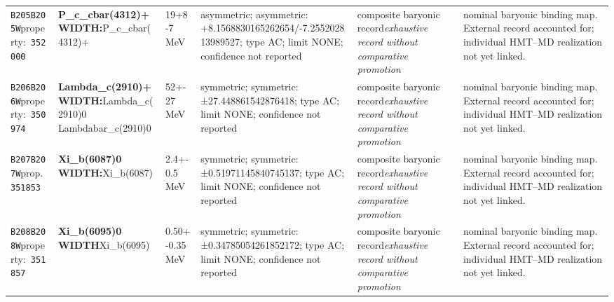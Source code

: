 \begin{landscape}
\begin{longtable}{L{1.85cm}L{4.45cm}L{2.35cm}L{4.05cm}L{3.35cm}L{7.15cm}}
\texttt{B205}\newline \texttt{B205W}\newline property:\ \texttt{352000} & \textbf{P\_\allowbreak{}c\_\allowbreak{}cbar(4312)+ WIDTH:}\newline P\_\allowbreak{}c\_\allowbreak{}cbar(4312)+ & 19+8-7\,MeV & asymmetric; asymmetric: +8.1568830165262654/-7.255202813989527; type AC; limit NONE; confidence not reported & composite baryonic record\newline \emph{exhaustive record without comparative promotion} & nominal baryonic binding map. External record accounted for; individual HMT--MD realization not yet linked. \\
\texttt{B206}\newline \texttt{B206W}\newline property:\ \texttt{350974} & \textbf{Lambda\_\allowbreak{}c(2910)+ WIDTH:}\newline Lambda\_\allowbreak{}c(2910)0 \textbar{}\allowbreak{} Lambdabar\_\allowbreak{}c(2910)0 & 52+-27\,MeV & symmetric; symmetric: ±27.448861542876418; type AC; limit NONE; confidence not reported & composite baryonic record\newline \emph{exhaustive record without comparative promotion} & nominal baryonic binding map. External record accounted for; individual HMT--MD realization not yet linked. \\
\texttt{B207}\newline \texttt{B207W}\newline prop.\ \texttt{351853} & \textbf{Xi\_\allowbreak{}b(6087)0 WIDTH:}\newline Xi\_\allowbreak{}b(6087) & 2.4+-0.5\,MeV & symmetric; symmetric: ±0.51971145840745137; type AC; limit NONE; confidence not reported & composite baryonic record\newline \emph{exhaustive record without comparative promotion} & nominal baryonic binding map. External record accounted for; individual HMT--MD realization not yet linked. \\
\texttt{B208}\newline \texttt{B208W}\newline property:\ \texttt{351857} & \textbf{Xi\_\allowbreak{}b(6095)0 WIDTH}\newline Xi\_\allowbreak{}b(6095) & 0.50+-0.35\,MeV & symmetric; symmetric: ±0.34785054261852172; type AC; limit NONE; confidence not reported & composite baryonic record\newline \emph{exhaustive record without comparative promotion} & nominal baryonic binding map. External record accounted for; individual HMT--MD realization not yet linked. \\

\end{longtable}
\end{landscape}
